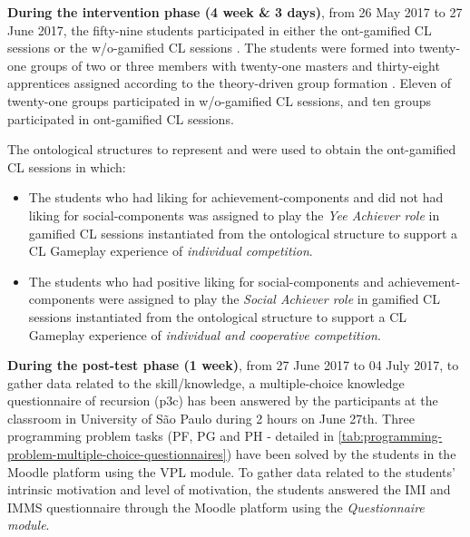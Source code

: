 \textbf{During the intervention phase (4 week \& 3 days)}, from 26 May 2017 to 27 June 2017, the fifty-nine students participated in either the ont-gamified CL sessions or the w/o-gamified CL sessions .
The students were formed into twenty-one groups of two or three members with twenty-one masters and thirty-eight apprentices assigned according to the theory-driven group formation \cite{IsotaniMizoguchi2008a}.
Eleven of twenty-one groups participated in w/o-gamified CL sessions, and ten groups participated in ont-gamified CL sessions.

The ontological structures to represent  and  were used to obtain the ont-gamified CL sessions in which:
\begin{itemize}
\item The students who had liking for achievement-components and did not had liking for social-components was assigned to play the \emph{Yee Achiever role} in gamified CL sessions instantiated from the ontological structure  to support a CL Gameplay experience of \emph{individual competition}.
\item The students who had positive liking for social-components and achievement-components were assigned to play the \emph{Social Achiever role} in gamified CL sessions instantiated from the ontological structure  to support a CL Gameplay experience of \emph{individual and cooperative competition}.
\end{itemize}

\textbf{During the post-test phase (1 week)}, from 27 June 2017 to 04 July 2017, to gather data related to the skill/knowledge, a multiple-choice knowledge questionnaire of recursion (p3c) has been answered by the participants at the classroom in University of São Paulo during 2 hours on June 27th. Three programming problem tasks (PF, PG and PH - detailed in \autoref{tab:programming-problem-multiple-choice-questionnaires}) have been solved by the students in the Moodle platform using the VPL module.
To gather data related to the students' intrinsic motivation and level of motivation, the students answered the IMI and IMMS questionnaire through the Moodle platform using the \emph{Questionnaire module}.

